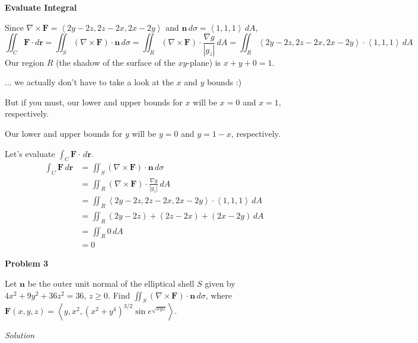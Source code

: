 \documentclass{article}
\newcommand{\lrp}[1]{\left( #1 \right)}
\newcommand{\lra}[1]{\left\langle #1 \right\rangle}
\renewcommand{\r}[0]{\mathbf{r}}
\newcommand{\F}[0]{\mathbf{F}}
\newcommand{\n}[0]{\mathbf{n}}
\newcommand{\Solution}{\textit{Solution}}
\begin{document}
{} \textbf{Evaluate Integral}

Since $\nabla \times \F=\lra{2y-2z,2z-2x,2x-2y}$ and $\n\,d\sigma=\lra{1,1,1}\,dA$,
\begin{equation*}
    \iint_C \F\cdot d\r=\iint_S\lrp{\nabla \times \F}\cdot\n\,d\sigma=\iint_R \lrp{\nabla \times \F}\cdot\frac{\nabla g}{\left|g_z\right|}\,dA=\iint_R \lra{2y-2z,2z-2x,2x-2y}\cdot \lra{1,1,1}\,dA
\end{equation*}
Our region $R$ (the shadow of the surface of the $xy$-plane) is $x+y+0=1$.

... we actually don't have to take a look at the $x$ and $y$ bounds :)

But if you must, our lower and upper bounds for $x$ will be $x=0$ and $x=1$, respectively.

Our lower and upper bounds for $y$ will be $y=0$ and $y=1-x$, respectively.

Let's evaluate $\displaystyle \int_C \F\cdot\,d\r$.
\begin{align*}
    \int_C \F\,d\r&=\iint_S \lrp{\nabla \times \F}\cdot\n\,d\sigma\\
    &=\iint_R \lrp{\nabla \times \F}\cdot\frac{\nabla g}{\left|g_z\right|}\,dA\\
    &=\iint_R \lra{2y-2z,2z-2x,2x-2y}\cdot \lra{1,1,1}\,dA\\
    &=\iint_R \lrp{2y-2z}+\lrp{2z-2x}+\lrp{2x-2y}\,dA\\
    &=\iint_R 0\,dA\tag{yes, they all cancel out!}\\
    &=\boxed{0}\tag{integral of $0$ is $0$}
\end{align*}

\newpage
{}
{}\textbf{Problem 3}

Let $\n$ be the outer unit normal of the elliptical shell $S$ given by $4x^2+9y^2+36z^2=36$, $z\geq 0$. Find $\displaystyle \iint_S \lrp{\nabla \times \F}\cdot\n\,d\sigma$, where $\displaystyle\F(x,y,z)=\lra{y,x^2,(x^2+y^4)^{3/2}\sin e^{\sqrt{xyz}}}$.

\Solution
\end{document}
